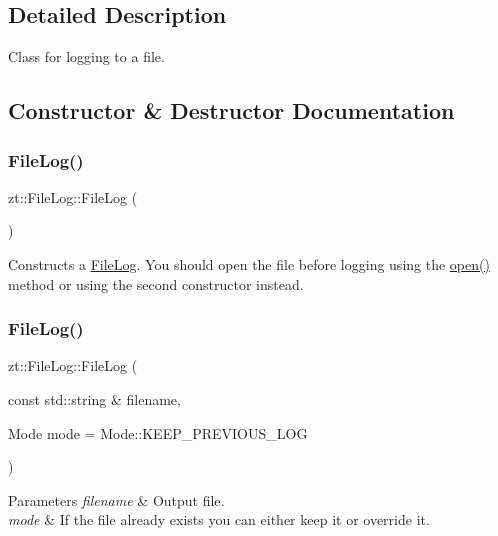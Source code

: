 \subsection{Detailed Description}
Class for logging to a file. 

\subsection{Constructor \& Destructor Documentation}
\mbox{\label{classzt_1_1_file_log_a9641437081c1f57fb9f439e077dd97f7}} 
\subsubsection{\texorpdfstring{File\+Log()}{FileLog()}\hspace{0.1cm}{\footnotesize\ttfamily [1/2]}}
{\footnotesize\ttfamily zt\+::\+File\+Log\+::\+File\+Log (\begin{DoxyParamCaption}{ }\end{DoxyParamCaption})}

Constructs a \hyperlink{classzt_1_1_file_log}{File\+Log}. You should open the file before logging using the \hyperlink{classzt_1_1_file_log_a4ef54c06277e13646f014d77a62fa2d6}{open()} method or using the second constructor instead. \mbox{\label{classzt_1_1_file_log_ac54d6900bdf714cfb297e066651905a3}} 
\subsubsection{\texorpdfstring{File\+Log()}{FileLog()}\hspace{0.1cm}{\footnotesize\ttfamily [2/2]}}
{\footnotesize\ttfamily zt\+::\+File\+Log\+::\+File\+Log (\begin{DoxyParamCaption}\item[{const std\+::string \&}]{filename,  }\item[{Mode}]{mode = {\ttfamily Mode\+:\+:KEEP\+\_\+PREVIOUS\+\_\+LOG} }\end{DoxyParamCaption})}


\begin{DoxyParams}{Parameters}
{\em filename} & Output file. \\
\hline
{\em mode} & If the file already exists you can either keep it or override it. \\
\hline
\end{DoxyParams}


